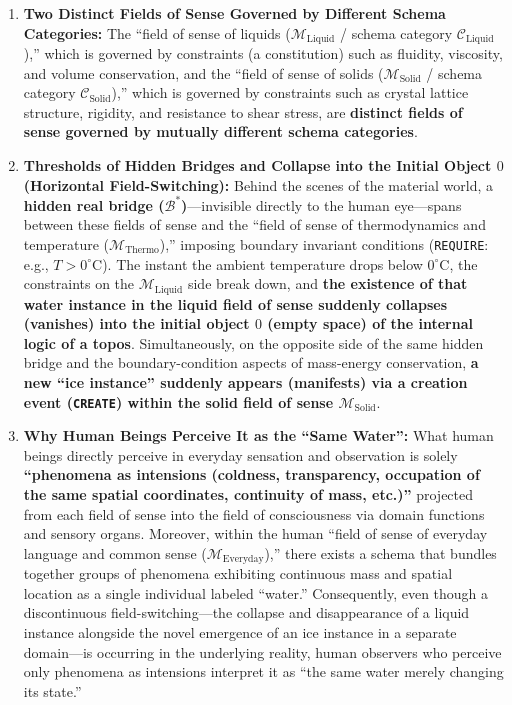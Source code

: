 \documentclass[11pt,a4paper]{article}
\theoremstyle{definition}
\theoremstyle{plain}
\begin{document}
\begin{enumerate}
    \item \textbf{Two Distinct Fields of Sense Governed by Different Schema Categories:}
    The ``field of sense of liquids ($\mathcal{M}_{\mathrm{Liquid}}$ / schema category $\mathcal{C}_{\mathrm{Liquid}}$),'' which is governed by constraints (a constitution) such as fluidity, viscosity, and volume conservation, and the ``field of sense of solids ($\mathcal{M}_{\mathrm{Solid}}$ / schema category $\mathcal{C}_{\mathrm{Solid}}$),'' which is governed by constraints such as crystal lattice structure, rigidity, and resistance to shear stress, are \textbf{distinct fields of sense governed by mutually different schema categories}.
    \item \textbf{Thresholds of Hidden Bridges and Collapse into the Initial Object $0$ (Horizontal Field-Switching):}
    Behind the scenes of the material world, a \textbf{hidden real bridge ($\mathcal{B}^*$)}---invisible directly to the human eye---spans between these fields of sense and the ``field of sense of thermodynamics and temperature ($\mathcal{M}_{\mathrm{Thermo}}$),'' imposing boundary invariant conditions (\texttt{REQUIRE}: e.g., $T > 0^\circ\mathrm{C}$). The instant the ambient temperature drops below $0^\circ\mathrm{C}$, the constraints on the $\mathcal{M}_{\mathrm{Liquid}}$ side break down, and \textbf{the existence of that water instance in the liquid field of sense suddenly collapses (vanishes) into the initial object $0$ (empty space) of the internal logic of a topos}. Simultaneously, on the opposite side of the same hidden bridge and the boundary-condition aspects of mass-energy conservation, \textbf{a new ``ice instance'' suddenly appears (manifests) via a creation event (\texttt{CREATE}) within the solid field of sense $\mathcal{M}_{\mathrm{Solid}}$}.
    \item \textbf{Why Human Beings Perceive It as the ``Same Water'':}
    What human beings directly perceive in everyday sensation and observation is solely \textbf{``phenomena as intensions (coldness, transparency, occupation of the same spatial coordinates, continuity of mass, etc.)''} projected from each field of sense into the field of consciousness via domain functions and sensory organs. Moreover, within the human ``field of sense of everyday language and common sense ($\mathcal{M}_{\mathrm{Everyday}}$),'' there exists a schema that bundles together groups of phenomena exhibiting continuous mass and spatial location as a single individual labeled ``water.'' Consequently, even though a discontinuous field-switching---the collapse and disappearance of a liquid instance alongside the novel emergence of an ice instance in a separate domain---is occurring in the underlying reality, human observers who perceive only phenomena as intensions interpret it as ``the same water merely changing its state.''
\end{enumerate}
\end{document}
